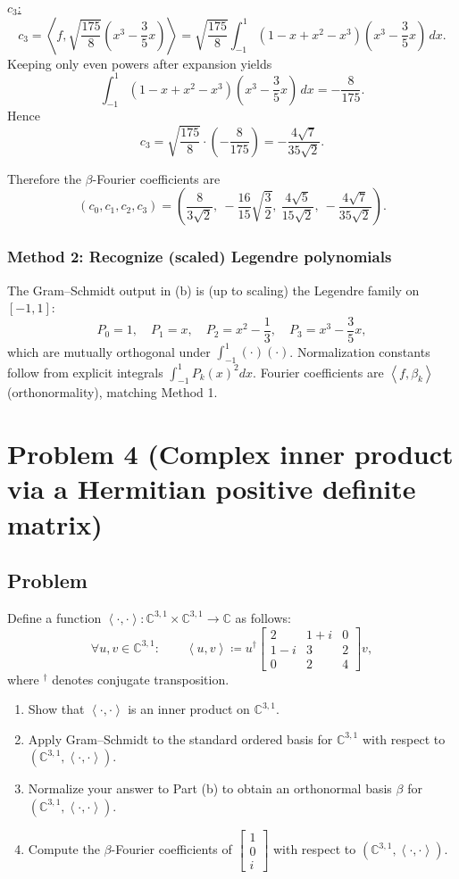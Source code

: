 \documentclass[12pt]{article}
\newcommand{\df}{\coloneqq}
\newcommand{\C}{\mathbb{C}}
\newcommand{\ip}[2]{\left\langle #1,#2\right\rangle}
\begin{document}
\begin{enumerate}[label=(\alph*)]
\underline{$c_3$:}
\[
c_3=\ip{f}{\sqrt{\frac{175}{8}}\left(x^3-\frac35 x\right)}
=\sqrt{\frac{175}{8}}\int_{-1}^1 (1-x+x^2-x^3)\left(x^3-\frac35 x\right)\,dx.
\]
Keeping only even powers after expansion yields
\[
\int_{-1}^1 (1-x+x^2-x^3)\left(x^3-\frac35 x\right)\,dx
=-\frac{8}{175}.
\]
Hence
\[
c_3=\sqrt{\frac{175}{8}}\cdot\left(-\frac{8}{175}\right)=-\frac{4\sqrt7}{35\sqrt2}.
\]

Therefore the $\beta$-Fourier coefficients are
\[
\boxed{\,
(c_0,c_1,c_2,c_3)=\left(\frac{8}{3\sqrt2},\ -\frac{16}{15}\sqrt{\frac32},\ \frac{4\sqrt5}{15\sqrt2},\ -\frac{4\sqrt7}{35\sqrt2}\right).
\,}
\]
\end{enumerate}

\subsubsection{Method 2: Recognize (scaled) Legendre polynomials}
The Gram--Schmidt output in (b) is (up to scaling) the Legendre family on $[-1,1]$:
\[
P_0=1,\quad P_1=x,\quad P_2=x^2-\frac13,\quad P_3=x^3-\frac35 x,
\]
which are mutually orthogonal under $\int_{-1}^1(\cdot)(\cdot)$.
Normalization constants follow from explicit integrals $\int_{-1}^1 P_k(x)^2dx$.
Fourier coefficients are $\ip{f}{\beta_k}$ (orthonormality), matching Method 1.

\newpage
\section{Problem 4 (Complex inner product via a Hermitian positive definite matrix)}
\subsection{Problem}
Define a function $\ip{\cdot}{\cdot}:\C^{3,1}\times \C^{3,1}\to \C$ as follows:
\[
\forall u,v\in \C^{3,1}:\qquad
\ip{u}{v}\df u^{\dagger}
\begin{bmatrix}
2 & 1+i & 0\\
1-i & 3 & 2\\
0 & 2 & 4
\end{bmatrix}
v,
\]
where ${}^\dagger$ denotes conjugate transposition.
\begin{enumerate}[label=(\alph*)]
\item Show that $\ip{\cdot}{\cdot}$ is an inner product on $\C^{3,1}$.
\item Apply Gram--Schmidt to the standard ordered basis for $\C^{3,1}$ with respect to $(\C^{3,1},\ip{\cdot}{\cdot})$.
\item Normalize your answer to Part (b) to obtain an orthonormal basis $\beta$ for $(\C^{3,1},\ip{\cdot}{\cdot})$.
\item Compute the $\beta$-Fourier coefficients of $\begin{bmatrix}1\\0\\ i\end{bmatrix}$ with respect to $(\C^{3,1},\ip{\cdot}{\cdot})$.
\end{enumerate}
\end{document}
